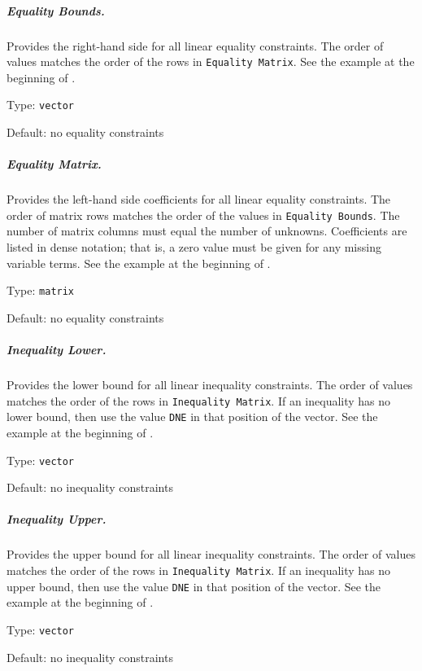 \subparagraph{Equality Bounds.}  \label{param:LC-eqbnds}
Provides the right-hand side for all linear equality constraints.
The order of values matches the order of the rows in {\tt Equality Matrix}.
See the example at the beginning of .

\hspace{0.2in}
Type: {\tt vector}

\hspace{0.2in}
Default: no equality constraints

\subparagraph{Equality Matrix.}  \label{param:LC-eqmat}
Provides the left-hand side coefficients for all linear equality
constraints.  The order of matrix rows matches the order of the values
in {\tt Equality Bounds}.
The number of matrix columns must equal the number of unknowns.
Coefficients are listed in dense notation; that is, a zero value must be
given for any missing variable terms.
See the example at the beginning of .

\hspace{0.2in}
Type: {\tt matrix}

\hspace{0.2in}
Default: no equality constraints

\subparagraph{Inequality Lower.}  \label{param:LC-ineql}
Provides the lower bound for all linear inequality constraints.
The order of values matches the order of the rows in {\tt Inequality Matrix}.
If an inequality has no lower bound, then use the value {\tt DNE} in that
position of the vector.
See the example at the beginning of .

\hspace{0.2in}
Type: {\tt vector}

\hspace{0.2in}
Default: no inequality constraints

\subparagraph{Inequality Upper.}  \label{param:LC-inequ}
Provides the upper bound for all linear inequality constraints.
The order of values matches the order of the rows in {\tt Inequality Matrix}.
If an inequality has no upper bound, then use the value {\tt DNE} in that
position of the vector.
See the example at the beginning of .

\hspace{0.2in}
Type: {\tt vector}

\hspace{0.2in}
Default: no inequality constraints

